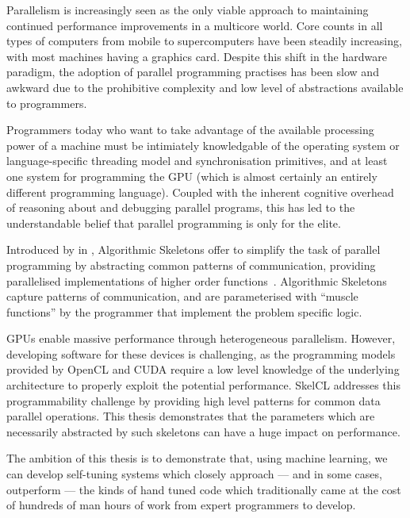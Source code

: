 Parallelism is increasingly seen as the only viable approach to
maintaining continued performance improvements in a multicore
world. Core counts in all types of computers from mobile to
supercomputers have been steadily increasing, with most machines
having a graphics card. Despite this shift in the hardware paradigm,
the adoption of parallel programming practises has been slow and
awkward due to the prohibitive complexity and low level of
abstractions available to programmers.

Programmers today who want to take advantage of the available
processing power of a machine must be intimiately knowledgable of the
operating system or language-specific threading model and
synchronisation primitives, and at least one system for programming
the GPU (which is almost certainly an entirely different programming
language). Coupled with the inherent cognitive overhead of reasoning
about and debugging parallel programs, this has led to the
understandable belief that parallel programming is only for the
elite. 

Introduced by \citeauthor{Cole1989} in \citeyear{Cole1989},
Algorithmic Skeletons offer to simplify the task of parallel
programming by abstracting common patterns of communication, providing
parallelised implementations of higher order
functions~\cite{Cole1989}. Algorithmic Skeletons capture patterns of
communication, and are parameterised with ``muscle functions'' by the
programmer that implement the problem specific logic.


GPUs enable massive performance through heterogeneous
parallelism. However, developing software for these devices is
challenging, as the programming models provided by OpenCL and CUDA
require a low level knowledge of the underlying architecture to
properly exploit the potential performance. SkelCL addresses this
programmability challenge by providing high level patterns for common
data parallel operations. This thesis demonstrates that the parameters
which are necessarily abstracted by such skeletons can have a huge
impact on performance.

The ambition of this thesis is to demonstrate that, using machine
learning, we can develop self-tuning systems which closely approach
--- and in some cases, outperform --- the kinds of hand tuned code
which traditionally came at the cost of hundreds of man hours of work
from expert programmers to develop.

